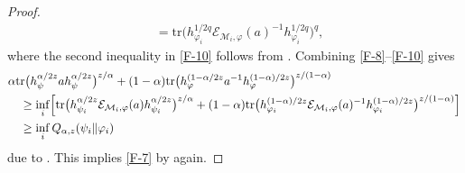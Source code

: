 \documentclass[11pt,reqno]{article}
\numberwithin{equation}{section}
\def\cM{\mathcal{M}}
\def\ffi{\varphi}
\def\tr{\mathrm{tr}}
\def\cE{\mathcal{E}}
\begin{document}
\begin{proof}
\begin{equation}
\begin{aligned}
&=\tr\bigl(h_{\ffi_i}^{1/2q}\cE_{\cM_i,\ffi}(a)^{-1}h_{\ffi_i}^{1/2q}\bigr)^q,
\end{aligned}
\end{equation}
where the second inequality in \eqref{F-10} follows from \cite[Corollary 2.3]{Ch}. Combining
\eqref{F-8}--\eqref{F-10} gives
\begin{align*}
&\alpha\tr\bigl(h_\psi^{\alpha/2z}ah_\psi^{\alpha/2z}\bigr)^{z/\alpha}
+(1-\alpha)\tr\bigl(h_\ffi^{(1-\alpha/2z}a^{-1}h_\ffi^{(1-\alpha)/2z}\bigr)^{z/(1-\alpha)} \\
&\quad\ge\inf_i\Bigl[\tr\bigl(h_{\psi_i}^{\alpha/2z}\cE_{\cM_i,\ffi}(a)h_{\psi_i}^{\alpha/2z}\bigr)^{z/\alpha}
+(1-\alpha)\tr\bigl(h_{\ffi_i}^{(1-\alpha)/2z}\cE_{\cM_i,\ffi}(a)^{-1}h_{\ffi_i}^{(1-\alpha)/2z}\bigr)^{z/(1-\alpha)}\Bigr] \\
&\quad\ge\inf_iQ_{\alpha,z}(\psi_i\|\ffi_i)
\end{align*}
due to \cite[Theorem 1(vi)]{K}. This implies \eqref{F-7} by \cite[Theorem 1(vi)]{K} again.


\end{proof}
\end{document}
